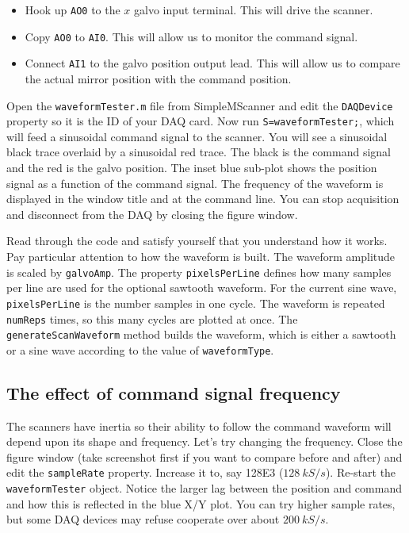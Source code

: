 \documentclass[a4paper]{report}
\begin{document}
\begin{itemize}
    \item Hook up \texttt{AO0} to the $x$ galvo input terminal. This will drive the scanner. 
    \item Copy \texttt{AO0} to \texttt{AI0}. This will allow us to monitor the command signal.
    \item Connect \texttt{AI1} to the galvo position output lead. This will allow us to compare the actual mirror position with the command position.
\end{itemize}

Open the \texttt{waveformTester.m} file from SimpleMScanner and edit the \texttt{DAQDevice} property so it is the ID of your DAQ card. 
Now run \texttt{S=waveformTester;}, which will feed a sinusoidal command signal to the scanner. 
You will see a sinusoidal black trace overlaid by a sinusoidal red trace. 
The black is the command signal and the red is the galvo position. 
The inset blue sub-plot shows the position signal as a function of the command signal. 
The frequency of the waveform is displayed in the window title and at the command line. 
You can stop acquisition and disconnect from the DAQ by closing the figure window.

Read through the code and satisfy yourself that you understand how it works. 
Pay particular attention to how the waveform is built. 
The waveform amplitude is scaled by \texttt{galvoAmp}.
The property \texttt{pixelsPerLine} defines how many samples per line are used for the optional sawtooth waveform. 
For the current sine wave, \texttt{pixelsPerLine} is the number samples in one cycle. 
The waveform is repeated \texttt{numReps} times, so this many cycles are plotted at once. 
The \texttt{generateScanWaveform} method builds the waveform, which is either a sawtooth or a sine wave according to the value of \texttt{waveformType}.


\subsection{The effect of command signal frequency}
The scanners have inertia so their ability to follow the command waveform will depend upon its shape and frequency. 
Let's try changing the frequency. 
Close the figure window (take screenshot first if you want to compare before and after) and edit the \texttt{sampleRate} property.
Increase it to, say 128E3 ($128~kS/s$). 
Re-start the \texttt{waveformTester} object. 
Notice the larger lag between the position and command and how this is reflected in the blue X/Y plot. 
You can try higher sample rates, but some DAQ devices may refuse cooperate over about $200~kS/s$.
\end{document}
